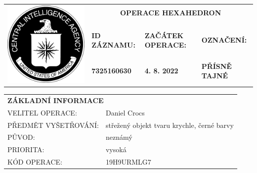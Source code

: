 \documentclass[a4paper, 11pt]{article}
\newlength{\fontheight}
\def\bottomrulewidth{0.3mm}		%
\def\tabtitleextraheight{5pt}	%
\def\tablestretch{1.4}			%
\newcommand{\blackcell}{\cellcolor{black} \color{white} \ttfamily \bfseries}
\newcommand{\ti}[2]{\ttfamily \MakeUppercase{#1}: & \ttfamily #2 \\ \midrule}
\newcommand{\lti}[2]{\ttfamily \MakeUppercase{#1}: & \ttfamily #2 \\ \bottomrule[\bottomrulewidth]}
\newcommand{\tabtitle}[2]{\multicolumn{#1}{l}{\blackcell \MakeUppercase{#2}\rule{0pt}{\dimexpr \fontheight + 1pt + \tabtitleextraheight \relax} } \\ [\tabtitleextraheight]}
\begin{document}
	
	\noindent
	\begin{table}[H]
		\renewcommand\tabularxcolumn[1]{m{#1}}
		\def\arraystretch{1.5}
		\begin{tabularx}{\textwidth}{l X X X}
			\multirow{4}{*}{ \includegraphics[scale=0.22]{sources/CIA_logo.pdf} } & \multicolumn{3}{c}{\bfseries \ttfamily \Huge OPERACE HEXAHEDRON} \\
			&&&\\
			& \blackcell ID ZÁZNAMU: & \blackcell ZAČÁTEK OPERACE: & \blackcell OZNAČENÍ: \\
			& \blackcell 7325160630 & \blackcell 4. 8. 2022 & \blackcell PŘÍSNĚ TAJNÉ \\
			
		\end{tabularx}
	\end{table}
	\vspace*{-0.5cm}
	\noindent
	\begin{minipage}[t]{0.62\textwidth}
		\begin{table}[H]
			\renewcommand\tabularxcolumn[1]{m{#1}}
			\def\arraystretch{\tablestretch}
			\begin{tabularx}{\textwidth}{l X}
				\tabtitle{2}{základní informace}
				\ti{velitel operace}{Daniel Crocs}
				\ti{předmět vyšetřování}{střežený objekt tvaru krychle, černé barvy}
				\ti{původ}{neznámý}
				\ti{priorita}{vysoká}
				\lti{kód operace}{19H9URMLG7}
			\end{tabularx}
		\end{table}
	\end{minipage}
\end{document}

